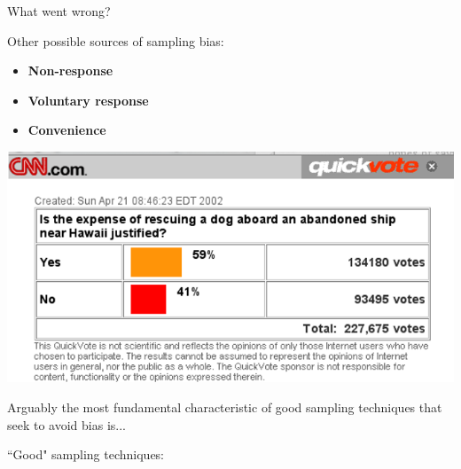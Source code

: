 \documentclass[11pt,letterpaper,twoside]{article}
\begin{document}
What went wrong?

\newpage

Other possible sources of sampling bias: 

\begin{itemize}

\item {\bf Non-response} \vspace{60pt}

\item {\bf Voluntary response} \vspace{60pt}

\item {\bf Convenience} \vspace{60pt}

\end{itemize}

\begin{center}
\includegraphics[scale=1.5]{images/cnn.png}
\end{center}

Arguably the most fundamental characteristic of good sampling techniques that seek to avoid bias is...

\newpage

``Good" sampling techniques:
\end{document}
